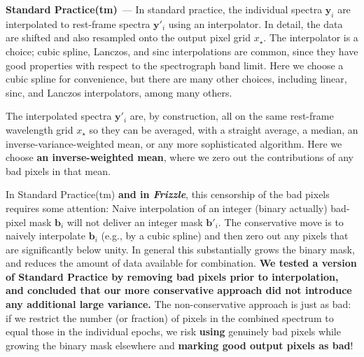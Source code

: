 \documentclass[modern, linenumbers]{aastex631}
\renewcommand{\paragraph}[1]{\medskip\par\noindent\textbf{#1}~---}
\newcommand{\name}{\textsl{Frizzle}}
\newcommand{\modified}[1]{\textcolor{Emerald}{\textbf{#1}}}
\begin{document}
\paragraph{Standard Practice(tm)}
In standard practice, the individual spectra \modified{$\mathbf{y}_i$} are interpolated to rest-frame spectra \modified{$\mathbf{y}'_i$} using an interpolator.
In detail, the data are shifted and also resampled onto the output pixel grid $x_\star$.
The interpolator is a choice; cubic spline, Lanczos, and sinc interpolations are common, since they have good properties with respect to the spectrograph band limit.
Here we choose a cubic spline for convenience, but there are many other choices, including linear, sinc, and Lanczos interpolators, among many others.

The interpolated spectra \modified{$\mathbf{y}'_i$} are, by construction, all on the same rest-frame wavelength grid $x_\star$ so they can be averaged, with a straight average, a median, an inverse-variance-weighted mean, or any more sophisticated algorithm.
Here we choose \modified{an inverse-weighted mean}, where we zero out the contributions of any bad pixels in that mean.


In Standard Practice(tm) \modified{and in \name}, this censorship of the bad pixels requires some attention:
Naive interpolation of an integer (binary actually) bad-pixel mask \modified{$\mathbf{b}_i$} will not deliver an integer mask \modified{$\mathbf{b}'_i$}.
The conservative move is to naively interpolate \modified{$\mathbf{b}_i$} (e.g., by a cubic spline) and then zero out any pixels that are significantly below unity.
In general this substantially grows the binary mask, and reduces the amount of data available for combination.
\modified{We tested a version of Standard Practice by removing bad pixels prior to interpolation, and concluded that our more conservative approach did not introduce any additional large variance.}
The non-conservative approach is just as bad: if we restrict the number (or fraction) of pixels in the combined spectrum to equal those in the individual epochs, we risk \modified{using} genuinely bad pixels while growing the binary mask elsewhere and \modified{marking good output pixels as bad}!
\end{document}
